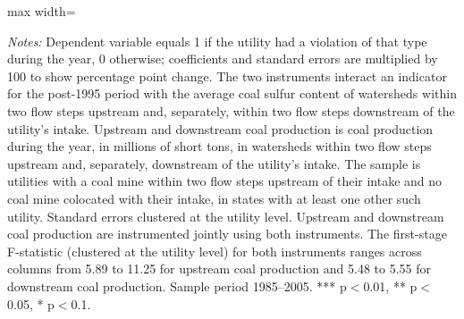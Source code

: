 \begin{table}[htbp]
{\begin{adjustbox}{max width=\linewidth}
\begin{tabular}
\bottomrule
\end{tabular}
\end{adjustbox}
}
\begin{minipage}{\linewidth}
\vspace{4pt}
\footnotesize
\raggedright
\textit{Notes:} Dependent variable equals 1 if the utility had a violation of that type during the year, 0 otherwise; coefficients and standard errors are multiplied by 100 to show percentage point change. The two instruments interact an indicator for the post-1995 period with the average coal sulfur content of watersheds within two flow steps upstream and, separately, within two flow steps downstream of the utility's intake. Upstream and downstream coal production is coal production during the year, in millions of short tons, in watersheds within two flow steps upstream and, separately, downstream of the utility's intake. The sample is utilities with a coal mine within two flow steps upstream of their intake and no coal mine colocated with their intake, in states with at least one other such utility. Standard errors clustered at the utility level. Upstream and downstream coal production are instrumented jointly using both instruments. The first-stage F-statistic (clustered at the utility level) for both instruments ranges across columns from 5.89 to 11.25 for upstream coal production and 5.48 to 5.55 for downstream coal production. Sample period 1985--2005. *** p$<$0.01, ** p$<$0.05, * p$<$0.1.
\end{minipage}
\end{table}
